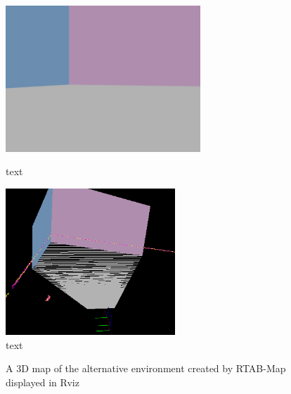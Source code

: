 \documentclass[a4paper]{article}
\begin{document}
\begin{figure}[h]
\centering
\begin{minipage}[t]{0.45\textwidth}
\centering
\includegraphics[height=5.5cm]{slam_house_features_corner_3}
\caption{text}
\end{minipage}
\hspace{1cm}
\begin{minipage}[t]{0.45\textwidth}
\centering
\includegraphics[height=5.5cm]{slam_house_constraints_3}
\caption{text}
\end{minipage}
\end{figure}

\clearpage

\begin{figure}
\centering
{}
\caption{A 3D map of the alternative environment created by RTAB-Map displayed in Rviz}
\end{figure}
\end{document}
